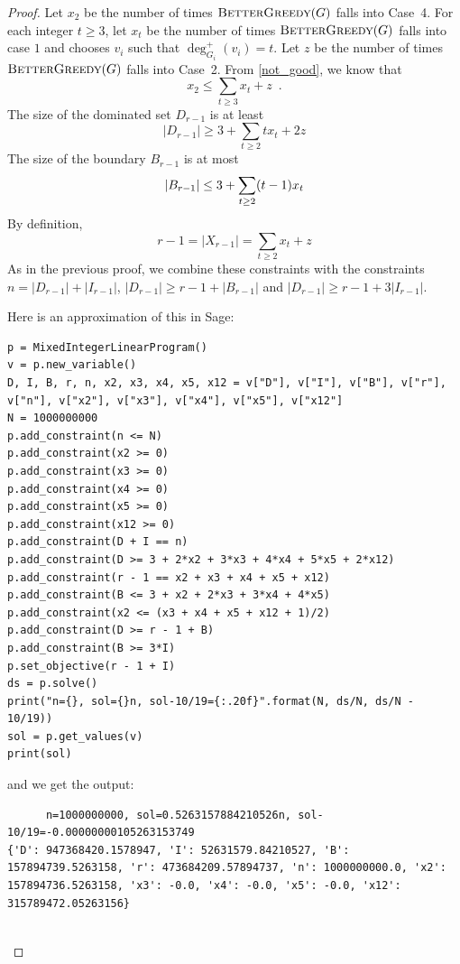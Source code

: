 \documentclass[12pt]{article}
\begin{document}
\begin{proof}
  Let $x_2$ be the number of times $\textsc{BetterGreedy}(G)$ falls into Case~4.
  For each integer $t\ge 3$, let $x_t$ be the number of times $\textsc{BetterGreedy}(G)$ falls into case $1$ and chooses $v_i$ such that $\deg^+_{G_i}(v_i)=t$.  Let $z$ be the number of times $\textsc{BetterGreedy}(G)$ falls into Case~2.  From \cref{not_good}, we know that
  \begin{equation}
      x_2 \le \sum_{t\ge 3}x_t + z \enspace .
  \end{equation}
  The size of the dominated set $D_{r-1}$ is at least
  \[
    |D_{r-1}| \ge 3 + \sum_{t\ge 2}tx_t + 2z 
  \]
  The size of the boundary $B_{r-1}$ is at most
  \begin{equation}
       |B_{r-1}| \le 3 + \sum_{t\ge 2} (t-1)x_t \\
  \end{equation}
  By definition,
  \[
     r-1 = |X_{r-1}| = \sum_{t\ge 2} x_t + z 
  \]
  As in the previous proof, we combine these constraints with the constraints $n=|D_{r-1}|+|I_{r-1}|$,  $|D_{r-1}|\ge r-1+|B_{r-1}|$ and $|D_{r-1}|\ge r-1+3|I_{r-1}|$.

  Here is an approximation of this in Sage:
  \begin{verbatim}
p = MixedIntegerLinearProgram()
v = p.new_variable()
D, I, B, r, n, x2, x3, x4, x5, x12 = v["D"], v["I"], v["B"], v["r"], v["n"], v["x2"], v["x3"], v["x4"], v["x5"], v["x12"]
N = 1000000000
p.add_constraint(n <= N)
p.add_constraint(x2 >= 0)
p.add_constraint(x3 >= 0)
p.add_constraint(x4 >= 0)
p.add_constraint(x5 >= 0)
p.add_constraint(x12 >= 0)
p.add_constraint(D + I == n)
p.add_constraint(D >= 3 + 2*x2 + 3*x3 + 4*x4 + 5*x5 + 2*x12)
p.add_constraint(r - 1 == x2 + x3 + x4 + x5 + x12)
p.add_constraint(B <= 3 + x2 + 2*x3 + 3*x4 + 4*x5)
p.add_constraint(x2 <= (x3 + x4 + x5 + x12 + 1)/2)
p.add_constraint(D >= r - 1 + B)
p.add_constraint(B >= 3*I)
p.set_objective(r - 1 + I)
ds = p.solve()
print("n={}, sol={}n, sol-10/19={:.20f}".format(N, ds/N, ds/N - 10/19))
sol = p.get_values(v)
print(sol)
  \end{verbatim}
  and we get the output:
  \begin{verbatim}
      n=1000000000, sol=0.5263157884210526n, sol-10/19=-0.00000000105263153749
{'D': 947368420.1578947, 'I': 52631579.84210527, 'B': 157894739.5263158, 'r': 473684209.57894737, 'n': 1000000000.0, 'x2': 157894736.5263158, 'x3': -0.0, 'x4': -0.0, 'x5': -0.0, 'x12': 315789472.05263156}


\end{verbatim}
\end{proof}
\end{document}
